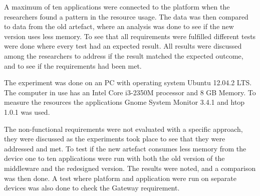 A maximum of ten applications were connected to the platform when the researchers found a pattern in the resource usage. The data was then compared to data from the old artefact, where an analysis was done to see if the new version uses less memory. To see that all requirements were fulfilled different tests were done where every test had an expected result. All results were discussed among the researchers to address if the result matched the expected outcome, and to see if the requirements had been met. 

The experiment was done on an PC with operating system Ubuntu 12.04.2 LTS. The computer in use has an Intel Core i3-2350M processor and 8 GB Memory. To measure the resources the applications Gnome System Monitor 3.4.1 \cite{gnomesm} and htop 1.0.1 \cite{htop} was used. 

The non-functional requirements were not evaluated with a specific approach, they were discussed as the experiments took place to see that they were addressed and met. To test if the new artefact consumes less memory from the device one to ten applications were run with both the old version of the middleware and the redesigned version. The results were noted, and a comparison was then done. A test where platform and application were run on separate devices was also done to check the Gateway requirement.

